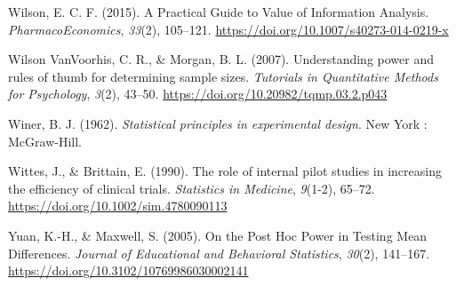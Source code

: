 \documentclass[
  english,
  ,jou, a4paper,floatsintext]{apa6}
\newlength{\cslhangindent}
\newenvironment{cslreferences}%
  {\setlength{\parindent}{0pt}%
  \everypar{\setlength{\hangindent}{\cslhangindent}}\ignorespaces}%
  {\par}
\begin{document}
\begin{cslreferences}
\leavevmode\hypertarget{ref-wilson_practical_2015}{}%
Wilson, E. C. F. (2015). A Practical Guide to Value of Information Analysis. \emph{PharmacoEconomics}, \emph{33}(2), 105--121. \url{https://doi.org/10.1007/s40273-014-0219-x}

\leavevmode\hypertarget{ref-wilson_vanvoorhis_understanding_2007}{}%
Wilson VanVoorhis, C. R., \& Morgan, B. L. (2007). Understanding power and rules of thumb for determining sample sizes. \emph{Tutorials in Quantitative Methods for Psychology}, \emph{3}(2), 43--50. \url{https://doi.org/10.20982/tqmp.03.2.p043}

\leavevmode\hypertarget{ref-winer_statistical_1962}{}%
Winer, B. J. (1962). \emph{Statistical principles in experimental design}. New York : McGraw-Hill.

\leavevmode\hypertarget{ref-wittes_role_1990}{}%
Wittes, J., \& Brittain, E. (1990). The role of internal pilot studies in increasing the efficiency of clinical trials. \emph{Statistics in Medicine}, \emph{9}(1-2), 65--72. \url{https://doi.org/10.1002/sim.4780090113}

\leavevmode\hypertarget{ref-yuan_post_2005}{}%
Yuan, K.-H., \& Maxwell, S. (2005). On the Post Hoc Power in Testing Mean Differences. \emph{Journal of Educational and Behavioral Statistics}, \emph{30}(2), 141--167. \url{https://doi.org/10.3102/10769986030002141}
\end{cslreferences}

\endgroup
\end{document}

